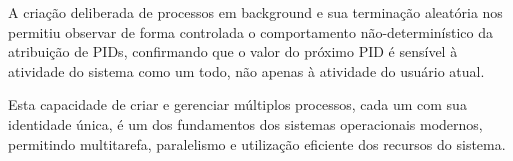 \documentclass[a4paper,11pt]{article}
\begin{document}
A criação deliberada de processos em background e sua terminação aleatória nos permitiu observar de forma controlada o comportamento não-determinístico da atribuição de PIDs, confirmando que o valor do próximo PID é sensível à atividade do sistema como um todo, não apenas à atividade do usuário atual.

Esta capacidade de criar e gerenciar múltiplos processos, cada um com sua identidade única, é um dos fundamentos dos sistemas operacionais modernos, permitindo multitarefa, paralelismo e utilização eficiente dos recursos do sistema.
\end{document}
